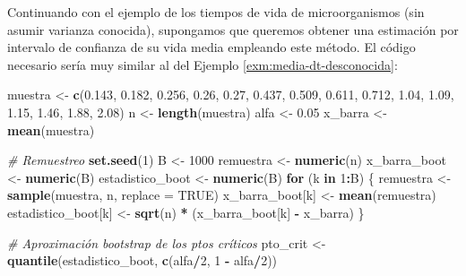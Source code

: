 \documentclass[]{book}
\newenvironment{Shaded}{\begin{snugshade}}{\end{snugshade}}
\newcommand{\KeywordTok}[1]{\textcolor[rgb]{0.13,0.29,0.53}{\textbf{#1}}}
\newcommand{\DataTypeTok}[1]{\textcolor[rgb]{0.13,0.29,0.53}{#1}}
\newcommand{\DecValTok}[1]{\textcolor[rgb]{0.00,0.00,0.81}{#1}}
\newcommand{\FloatTok}[1]{\textcolor[rgb]{0.00,0.00,0.81}{#1}}
\newcommand{\StringTok}[1]{\textcolor[rgb]{0.31,0.60,0.02}{#1}}
\newcommand{\CommentTok}[1]{\textcolor[rgb]{0.56,0.35,0.01}{\textit{#1}}}
\newcommand{\OtherTok}[1]{\textcolor[rgb]{0.56,0.35,0.01}{#1}}
\newcommand{\ControlFlowTok}[1]{\textcolor[rgb]{0.13,0.29,0.53}{\textbf{#1}}}
\newcommand{\OperatorTok}[1]{\textcolor[rgb]{0.81,0.36,0.00}{\textbf{#1}}}
\newcommand{\NormalTok}[1]{#1}
\theoremstyle{definition}
\theoremstyle{definition}
\theoremstyle{definition}
\theoremstyle{remark}
\begin{document}
Continuando con el ejemplo de los tiempos de vida de microorganismos
(sin asumir varianza conocida), supongamos que queremos obtener una
estimación por intervalo de confianza de su vida media empleando este
método. El código necesario sería muy similar al del Ejemplo
\ref{exm:media-dt-desconocida}:

\begin{Shaded}
\begin{Highlighting}[]
\NormalTok{muestra <-}\StringTok{ }\KeywordTok{c}\NormalTok{(}\FloatTok{0.143}\NormalTok{, }\FloatTok{0.182}\NormalTok{, }\FloatTok{0.256}\NormalTok{, }\FloatTok{0.26}\NormalTok{, }\FloatTok{0.27}\NormalTok{, }\FloatTok{0.437}\NormalTok{, }\FloatTok{0.509}\NormalTok{, }
             \FloatTok{0.611}\NormalTok{, }\FloatTok{0.712}\NormalTok{, }\FloatTok{1.04}\NormalTok{, }\FloatTok{1.09}\NormalTok{, }\FloatTok{1.15}\NormalTok{, }\FloatTok{1.46}\NormalTok{, }\FloatTok{1.88}\NormalTok{, }\FloatTok{2.08}\NormalTok{)}
\NormalTok{n <-}\StringTok{ }\KeywordTok{length}\NormalTok{(muestra)}
\NormalTok{alfa <-}\StringTok{ }\FloatTok{0.05}
\NormalTok{x_barra <-}\StringTok{ }\KeywordTok{mean}\NormalTok{(muestra)}

\CommentTok{# Remuestreo}
\KeywordTok{set.seed}\NormalTok{(}\DecValTok{1}\NormalTok{)}
\NormalTok{B <-}\StringTok{ }\DecValTok{1000}
\NormalTok{remuestra <-}\StringTok{ }\KeywordTok{numeric}\NormalTok{(n)}
\NormalTok{x_barra_boot <-}\StringTok{ }\KeywordTok{numeric}\NormalTok{(B) }
\NormalTok{estadistico_boot <-}\StringTok{ }\KeywordTok{numeric}\NormalTok{(B)}
\ControlFlowTok{for}\NormalTok{ (k }\ControlFlowTok{in} \DecValTok{1}\OperatorTok{:}\NormalTok{B) \{}
\NormalTok{  remuestra <-}\StringTok{ }\KeywordTok{sample}\NormalTok{(muestra, n, }\DataTypeTok{replace =} \OtherTok{TRUE}\NormalTok{)}
\NormalTok{  x_barra_boot[k] <-}\StringTok{ }\KeywordTok{mean}\NormalTok{(remuestra)}
\NormalTok{  estadistico_boot[k] <-}\StringTok{ }\KeywordTok{sqrt}\NormalTok{(n) }\OperatorTok{*}\StringTok{ }\NormalTok{(x_barra_boot[k] }\OperatorTok{-}\StringTok{ }\NormalTok{x_barra)}
\NormalTok{\}}

\CommentTok{# Aproximación bootstrap de los ptos críticos}
\NormalTok{pto_crit <-}\StringTok{ }\KeywordTok{quantile}\NormalTok{(estadistico_boot, }\KeywordTok{c}\NormalTok{(alfa}\OperatorTok{/}\DecValTok{2}\NormalTok{, }\DecValTok{1} \OperatorTok{-}\StringTok{ }\NormalTok{alfa}\OperatorTok{/}\DecValTok{2}\NormalTok{))}


\end{Highlighting}
\end{Shaded}
\end{document}
